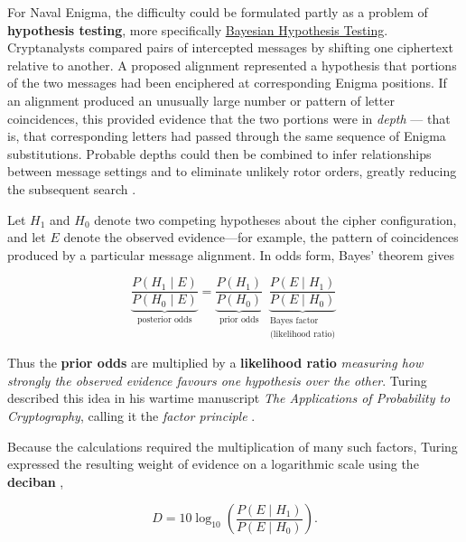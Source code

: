 For Naval Enigma, the difficulty could be formulated partly as a problem of \textbf{hypothesis testing}, more specifically \href{https://www.youtube.com/live/Ip8Ci5KUVRc?si=n0YSvhupRbd9GGuH}{Bayesian Hypothesis Testing}. Cryptanalysts compared pairs of intercepted messages by shifting one ciphertext relative to another. A proposed alignment represented a hypothesis that portions of the two messages had been enciphered at corresponding Enigma positions. If an alignment produced an unusually large number or pattern of letter coincidences, this provided evidence that the two portions were in \textit{depth} — that is, that corresponding letters had passed through the same sequence of Enigma substitutions. Probable depths could then be combined to infer relationships between message settings and to eliminate unlikely rotor orders, greatly reducing the subsequent search \cite{turing1941cryptography,alexander1945,zabell2012turing}.

Let $H_1$ and $H_0$ denote two competing hypotheses about the cipher
configuration, and let $E$ denote the observed evidence---for example, the pattern of coincidences produced by a particular message alignment. In odds form, Bayes' theorem gives

\begin{equation}
\boxed{
\underbrace{
\frac{P(H_1\mid E)}{P(H_0\mid E)}
}_{\text{posterior odds}}
=
\underbrace{
\frac{P(H_1)}{P(H_0)}
}_{\text{prior odds}}
\;
\underbrace{
\frac{P(E\mid H_1)}{P(E\mid H_0)}
}_{\substack{\text{Bayes factor}\\\text{(likelihood ratio)}}}
}
\end{equation}

Thus the \textbf{prior odds} are multiplied by a \textbf{likelihood ratio} \textit{measuring how strongly the observed evidence favours one hypothesis over the other}.  Turing described this idea in his wartime manuscript \textit{The Applications of Probability to Cryptography}, calling it the \emph{factor principle} \cite{turing1941cryptography,zabell2012turing}.

Because the calculations required the multiplication of many such factors, Turing expressed the resulting weight of evidence on a logarithmic scale using the \textbf{deciban} \cite{turing1941cryptography,good1979turing},

\begin{equation}
\boxed{
D
=
10\log_{10}
\left(
\frac{P(E\mid H_1)}{P(E\mid H_0)}
\right).
}
\end{equation}


